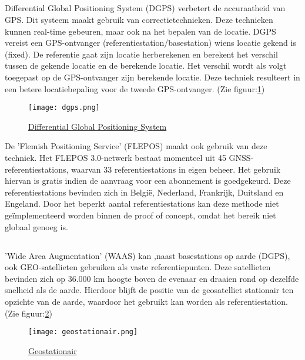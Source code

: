 \subsection{}
Differential Global Positioning System (DGPS) verbetert de accuraatheid van GPS. Dit systeem maakt gebruik van correctietechnieken. Deze technieken kunnen real-time gebeuren, maar ook na het bepalen van de locatie. DGPS vereist een GPS-ontvanger (referentiestation/basestation) wiens locatie gekend is (fixed). De referentie gaat zijn locatie herberekenen en berekent het verschil tussen de gekende locatie en de berekende locatie. Het verschil wordt als volgt toegepast op de GPS-ontvanger zijn berekende locatie. Deze techniek resulteert in een betere locatiebepaling voor de tweede GPS-ontvanger. \autocite{dgps} (Zie figuur:\ref{fig:dgps})
\begin{figure}
	\texttt{[image: dgps.png]}
	\caption{\href{https://www.researchgate.net/figure/Components-of-a-DGPS-System_fig1_252064818}{Differential Global Positioning System}}
	\label{fig:dgps}
\end{figure}
\newline
De 'Flemish Positioning Service' (FLEPOS) maakt ook gebruik van deze techniek. Het FLEPOS 3.0-netwerk bestaat momenteel uit 45 GNSS-referentiestations, waarvan 33 referentiestations in eigen beheer. Het gebruik hiervan is gratis indien de aanvraag voor een abonnement is goedgekeurd. Deze referentiestations bevinden zich in België, Nederland, Frankrijk, Duitsland en Engeland.
\newline
Door het beperkt aantal referentiestations kan deze methode niet geïmplementeerd worden binnen de proof of concept, omdat het bereik niet globaal genoeg is.
\subsection{}
'Wide Area Augmentation' (WAAS) kan ,naast basestations op aarde (DGPS), ook GEO-satellieten gebruiken als vaste referentiepunten. Deze satellieten bevinden zich op 36.000 km hoogte boven de evenaar en draaien rond op dezelfde snelheid als de aarde. Hierdoor blijft de positie van de geosatelliet stationair ten opzichte van de aarde, waardoor het gebruikt kan worden als referentiestation.(Zie figuur:\ref{fig:geostationair})
\begin{figure}
	\texttt{[image: geostationair.png]}
	\caption{\href{https://aardrijkskunde.dbz.be/graad3/taken/oefening_satellieten.htm}{Geostationair}}
	\label{fig:geostationair}
\end{figure}
